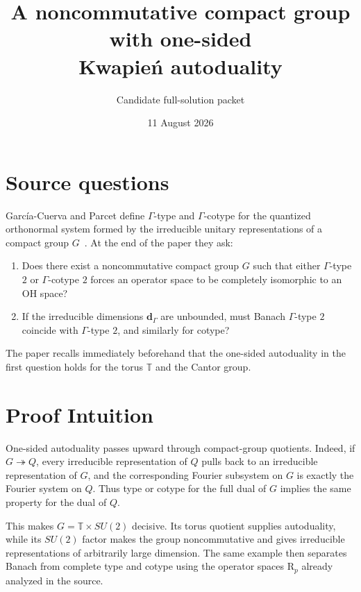 \documentclass[11pt]{article}
\title{A noncommutative compact group with one-sided\\Kwapie\'n autoduality}
\author{Candidate full-solution packet}
\date{11 August 2026}
\newcommand{\OH}{\mathrm{OH}}
\newcommand{\Rp}{\mathrm{R}}
\begin{document}
\maketitle

\begin{center}
\end{center}

\section{Source questions}

Garc\'ia-Cuerva and Parcet define $\Gamma$-type and
$\Gamma$-cotype for the quantized orthonormal system formed by the irreducible
unitary representations of a compact group $G$~\cite{GP}.  At the end of the
paper they ask:
\begin{enumerate}
 \item Does there exist a noncommutative compact group $G$ such that either
 $\Gamma$-type $2$ or $\Gamma$-cotype $2$ forces an operator space to be
 completely isomorphic to an $\OH$ space?
 \item If the irreducible dimensions $\mathbf d_\Gamma$ are unbounded, must
 Banach $\Gamma$-type $2$ coincide with $\Gamma$-type $2$, and similarly for
 cotype?
\end{enumerate}
The paper recalls immediately beforehand that the one-sided autoduality in
the first question holds for the torus $\mathbb T$ and the Cantor group.

\section{Proof Intuition}

One-sided autoduality passes upward through compact-group quotients.  Indeed,
if $G\twoheadrightarrow Q$, every irreducible representation of $Q$ pulls
back to an irreducible representation of $G$, and the corresponding Fourier
subsystem on $G$ is exactly the Fourier system on $Q$.  Thus type or cotype
for the full dual of $G$ implies the same property for the dual of $Q$.

This makes $G=\mathbb T\times SU(2)$ decisive.  Its torus quotient supplies
autoduality, while its $SU(2)$ factor makes the group noncommutative and gives
irreducible representations of arbitrarily large dimension.  The same
example then separates Banach from complete type and cotype using the
operator spaces $\Rp_p$ already analyzed in the source.
\end{document}
